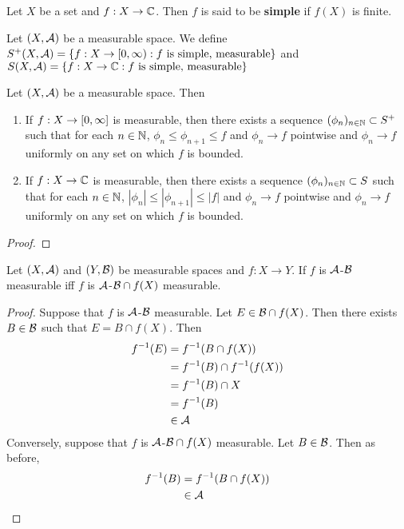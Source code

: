 \documentclass{book}
\begin{document}
	\begin{defn} 
		Let $X$ be a set and $f:X \rightarrow \mathbb{C}$. Then $f$ is said to be \textbf{simple} if $f(X)$ is finite.
	\end{defn}
	
	\begin{defn}  
		Let $(X,\mathcal{A})$ be a measurable space. We define $S^+(X,\mathcal{A}) = \{f:X \rightarrow [0,\infty): f \text{ is simple, measurable}\}$ and $S(X,\mathcal{A}) = \{f: X \rightarrow \mathbb{C}: f \text{ is simple, measurable}\}$
	\end{defn}
	
	\begin{ex} 
		Let $(X, \mathcal{A})$ be a measurable space. Then 
		\begin{enumerate}
			\item If $f: X \rightarrow [0,\infty]$ is measurable, then there exists a sequence $(\phi_n)_{n \in \mathbb{N}} \subset S^+$ such that for each $n \in \mathbb{N}$, $\phi_n \leq \phi_{n+1} \leq f$ and $\phi_n \rightarrow f$ pointwise and $\phi_n \rightarrow f$ uniformly on any set on which $f$ is bounded.
			
			\item If $f: X \rightarrow \mathbb{C}$ is measurable, then there exists a sequence $(\phi_n)_{n \in \mathbb{N}} \subset S$ such that for each $n \in \mathbb{N}$, $|\phi_n| \leq |\phi_{n+1}| \leq |f|$ and $\phi_n \rightarrow f$ pointwise and $\phi_n \rightarrow f$ uniformly on any set on which $f$ is bounded.
		\end{enumerate}
	\end{ex}

	\begin{proof}
	\end{proof}
	
	\begin{ex} 
		Let $(X, \mathcal{A})$ and $(Y, \mathcal{B})$ be measurable spaces and $f: X \rightarrow Y$. If $f$ is $\mathcal{A}$-$\mathcal{B}$ measurable iff $f$ is $\mathcal{A}$-$\mathcal{B} \cap f(X)$ measurable.
	\end{ex}	
	
	\begin{proof}
		Suppose that $f$ is $\mathcal{A}$-$\mathcal{B}$ measurable. Let $E \in \mathcal{B} \cap f(X)$. Then there exists $B \in \mathcal{B}$ such that $E = B \cap f(X)$. Then 
		\begin{align*}
			f^{-1}(E)
			&= f^{-1}(B \cap f(X)) \\
			&= f^{-1}(B) \cap f^{-1}(f(X)) \\
			&= f^{-1}(B) \cap X \\
			&= f^{-1}(B) \\
			& \in \mathcal{A}
		\end{align*}
		Conversely, suppose that $f$ is  $\mathcal{A}$-$\mathcal{B} \cap f(X)$ measurable. Let $B \in \mathcal{B}$. Then as before, 
		\begin{align*}
			f^{-1}(B) 
			&= f^{-1}(B \cap f(X))  \\
			& \in \mathcal{A} 
		\end{align*}
	\end{proof}
	
\end{document}
